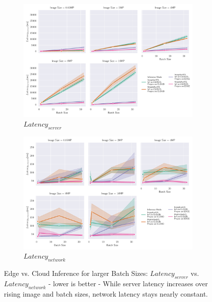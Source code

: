 \begin{figure}[!htb]
\centering
\begin{subfigure}[b]{0.95\textwidth}
   \includegraphics[width=1\linewidth]{./Bilder/single_plots/batch_size_plots/Effects_of_Batch_size_Inference_server_lat.pdf}
   \caption{$Latency_{server}$}
   \label{fig:BatchSizeServer} 
\end{subfigure}

\begin{subfigure}[b]{0.95\textwidth}
   \includegraphics[width=1\linewidth]{./Bilder/single_plots/batch_size_plots/Effects_of_Batch_size_Inference_network_lat.pdf}
   \caption{$Latency_{network}$}
   \label{fig:BatchSizeNetwork}
\end{subfigure}

\caption{Edge vs.  Cloud Inference for larger Batch Sizes:  $Latency_{server}$ vs. $Latency_{network}$ - lower is better - While server latency increases over rising image and batch sizes, network latency stays nearly constant.}
\end{figure}



